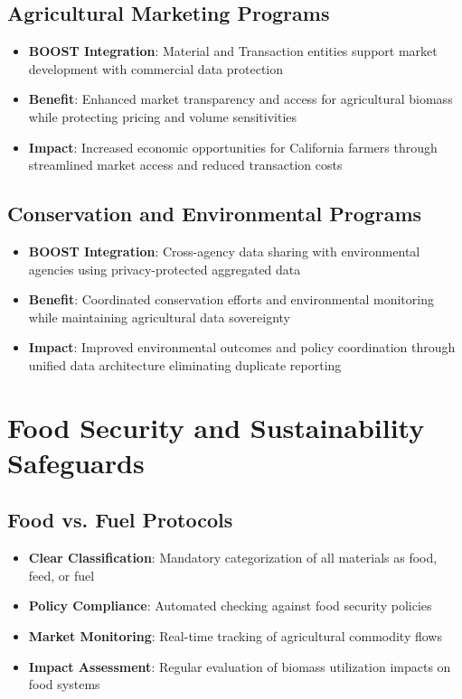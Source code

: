 \documentclass[title=small,preset=opensansnote,par=skip]{article}
\begin{document}
\subsection{Agricultural Marketing Programs}
\label{sec:org3414e52}
\begin{itemize}
\item \textbf{BOOST Integration}: Material and Transaction entities support market development with commercial data protection
\item \textbf{Benefit}: Enhanced market transparency and access for agricultural biomass while protecting pricing and volume sensitivities
\item \textbf{Impact}: Increased economic opportunities for California farmers through streamlined market access and reduced transaction costs
\end{itemize}
\subsection{Conservation and Environmental Programs}
\label{sec:org5d2b445}
\begin{itemize}
\item \textbf{BOOST Integration}: Cross-agency data sharing with environmental agencies using privacy-protected aggregated data
\item \textbf{Benefit}: Coordinated conservation efforts and environmental monitoring while maintaining agricultural data sovereignty
\item \textbf{Impact}: Improved environmental outcomes and policy coordination through unified data architecture eliminating duplicate reporting
\end{itemize}
\section{Food Security and Sustainability Safeguards}
\label{sec:org6f09559}

\subsection{Food vs. Fuel Protocols}
\label{sec:orgaff742c}
\begin{itemize}
\item \textbf{\textbf{Clear Classification}}: Mandatory categorization of all materials as food, feed, or fuel
\item \textbf{\textbf{Policy Compliance}}: Automated checking against food security policies
\item \textbf{\textbf{Market Monitoring}}: Real-time tracking of agricultural commodity flows
\item \textbf{\textbf{Impact Assessment}}: Regular evaluation of biomass utilization impacts on food systems
\end{itemize}
\end{document}
